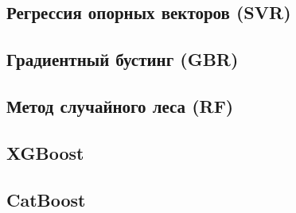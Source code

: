 \subsection{Регрессия опорных векторов (SVR)}
\subsection{Градиентный бустинг (GBR)}
\subsection{Метод случайного леса (RF)}
\subsection{XGBoost}
\subsection{CatBoost}
